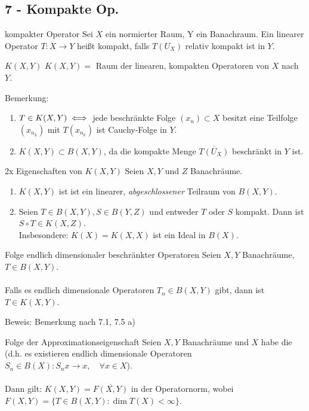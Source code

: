 \subsection*{7 - Kompakte Op.}

	\begin{karte}{kompakter Operator}
		Sei $X$ ein normierter Raum, Y ein Banachraum. Ein linearer Operator $T \colon X \rightarrow Y$ hei{\ss}t kompakt, falls $T(U_{X})$ relativ kompakt ist in $Y$.
	\end{karte}

	\begin{karte}{$K(X, Y)$}	
		$K(X, Y) =$ Raum der linearen, kompakten Operatoren von $X$ nach $Y$.
		
		Bemerkung:
		\begin{enumerate}[label=\alph*\upshape)]
			\item $T \in K(X, Y) \iff$ jede beschränkte Folge $(x_{n}) \subset X$ besitzt eine Teilfolge $(x_{n_{k}})$ mit $T(x_{n_{k}})$ ist Cauchy-Folge in $Y$.
			\item $K(X, Y) \subset B(X, Y)$, da die kompakte Menge $\overline{T(U_{X})}$ beschränkt in $Y$ ist.
		\end{enumerate}	
	\end{karte}

	\begin{karte}{2x Eigenschaften von $K(X, Y)$}		
		Seien $X, Y$ und $Z$ Banachräume.
		\begin{enumerate}[label=\alph*\upshape)]
			\item $K(X, Y)$ ist ist ein linearer, \textit{abgeschlossener} Teilraum von $B(X, Y)$.
			\item Seien $T \in B(X, Y), S \in B(Y, Z)$ und entweder $T$ oder $S$ kompakt. Dann ist $S \circ T \in K(X, Z)$. \\
			Insbesondere: $K(X) = K(X, X)$ ist ein Ideal in $B(X)$.
		\end{enumerate}
	\end{karte}

	\begin{karte}{Folge endlich dimensionaler beschränkter Operatoren}		
		Seien $X, Y$ Banachräume, $T \in B(X, Y)$. \\ \\
		Falls es endlich dimensionale Operatoren $T_{n} \in B(X, Y)$ gibt, dann ist $T \in K(X, Y)$.
		
		Beweis:
			Bemerkung nach 7.1, 7.5 a)	
	\end{karte}

	\begin{karte}{Folge der Approximationseigenschaft}	
		Seien $X, Y$ Banachräume und $X$ habe die  (d.h. es existieren endlich dimensionale Operatoren $S_{n} \in B(X): S_{n} x \rightarrow x, \quad \forall x \in X$). \\ \\
		Dann gilt: $K(X, Y) = \overline{F(X, Y)}$ in der Operatornorm, wobei $F(X, Y) = \{ T \in B(X, Y): \dim T(X) < \infty \}$.
	\end{karte}